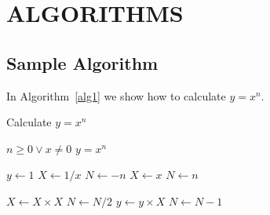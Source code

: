 \chapter*{ALGORITHMS}

\section{Sample Algorithm}
In Algorithm~\ref{alg1} we show how to calculate $y=x^n$.

\begin{algorithm}
  \caption{Calculate $y = x^n$}
  \label{alg1}
  \begin{algorithmic}
%     
    \REQUIRE $n \geq 0 \vee x \neq 0$
    \ENSURE $y = x^n$

    \STATE $y \leftarrow 1$
      \STATE $X \leftarrow 1 / x$
      \STATE $N \leftarrow -n$
    \ELSE
      \STATE $X \leftarrow x$
      \STATE $N \leftarrow n$
    \ENDIF

	\STATE $X \leftarrow X \times X$
	\STATE $N \leftarrow N / 2$
      \ELSE[$N$ is odd]
	\STATE $y \leftarrow y \times X$
	\STATE $N \leftarrow N - 1$
      \ENDIF
    \ENDWHILE


  \end{algorithmic}
\end{algorithm}

\endinput

